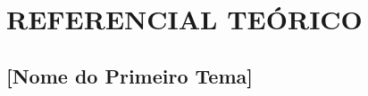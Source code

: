 %
%

\chapter{REFERENCIAL TEÓRICO}
\label{cap:referencial}

%
%



\section{[Nome do Primeiro Tema]}

%
%

